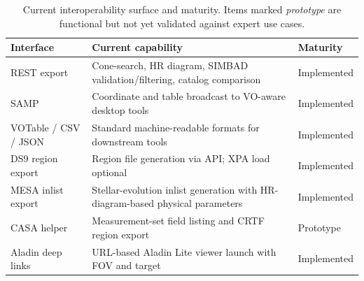 \documentclass[preprint,12pt,authoryear]{elsarticle}
\begin{document}
\begin{table}[htbp]
\centering
\caption{Current interoperability surface and maturity. Items marked \emph{prototype} are functional but not yet validated against expert use cases.}
\label{tab:interop}
\begin{tabularx}{\textwidth}{@{}p{2.8cm}Xl@{}}
\toprule
\textbf{Interface} & \textbf{Current capability} & \textbf{Maturity} \\
\midrule
REST export & Cone-search, HR diagram, SIMBAD validation/filtering, catalog comparison & Implemented \\
SAMP & Coordinate and table broadcast to VO-aware desktop tools & Implemented \\
VOTable / CSV / JSON & Standard machine-readable formats for downstream tools & Implemented \\
DS9 region export & Region file generation via API; XPA load optional & Implemented \\
MESA inlist export & Stellar-evolution inlist generation with HR-diagram-based physical parameters & Implemented \\
CASA helper & Measurement-set field listing and CRTF region export & Prototype \\
Aladin deep links & URL-based Aladin Lite viewer launch with FOV and target & Implemented \\
\bottomrule
\end{tabularx}
\end{table}
\end{document}
